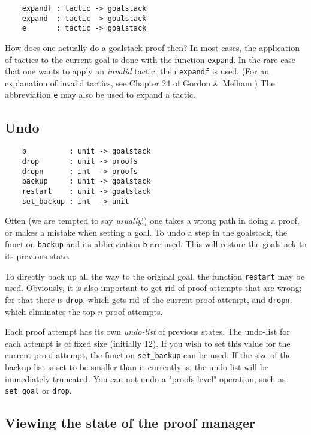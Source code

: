 \documentclass[12pt,fleqn,layout,a4paper]{report}
\begin{document}
\begin{verbatim}
    expandf : tactic -> goalstack
    expand  : tactic -> goalstack
    e       : tactic -> goalstack
\end{verbatim}

How does one actually do a goalstack proof then? In most cases, the
application of tactics to the current goal is done with the function
\verb+expand+. In the rare case that one wants to apply an
{\it invalid\/} tactic, then \verb+expandf+ is used. (For an
explanation of invalid tactics, see Chapter 24 of Gordon \& Melham.) The
abbreviation \verb+e+ may also be used to expand a tactic.


\subsection{Undo}

\begin{verbatim}
    b          : unit -> goalstack
    drop       : unit -> proofs
    dropn      : int  -> proofs
    backup     : unit -> goalstack
    restart    : unit -> goalstack
    set_backup : int  -> unit
\end{verbatim}

Often (we are tempted to say {\it usually}!) one takes a wrong path
in doing a proof, or makes a mistake when setting a goal. To undo a step
in the goalstack, the function \verb+backup+ and its abbreviation
\verb+b+ are used. This will restore the goalstack to its previous
state.


To directly back up all the way to the original goal, the function
\verb+restart+ may be used. Obviously, it is also important to get
rid of proof attempts that are wrong; for that there is \verb+drop+,
which gets rid of the current proof attempt, and \verb+dropn+, which
eliminates the top $n$ proof attempts.


Each proof attempt has its own {\it undo-list\/} of previous
states. The undo-list for each attempt is of fixed size (initially
12). If you wish to set this value for the current proof attempt, the
function \verb+set_backup+ can be used. If the size of the backup
list is set to be smaller than it currently is, the undo list will be
immediately truncated. You can not undo a "proofs-level" operation, such
as \verb+set_goal+ or \verb+drop+.

\subsection{Viewing the state of the proof manager}
\end{document}
